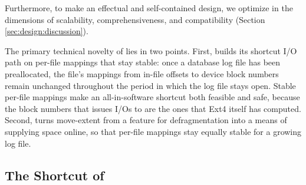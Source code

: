 Furthermore,
to make 
%
   an effectual and self-contained design, we optimize \odes in the dimensions of
 scalability, comprehensiveness, and compatibility (Section \ref{sec:design:discussion}). 

The primary technical novelty of \odes lies in two points. First, \odes builds its
shortcut I/O path on per-file mappings that stay stable: once a database log file
has been preallocated, the file's mappings from in-file offsets to device block
numbers remain unchanged throughout the period in which the log file stays open.
Stable per-file mappings make an all-in-software shortcut both feasible and safe,
because the block numbers that \odes issues I/Os to are the ones that Ext4 itself
has computed. Second, \odes turns move-extent from a feature for defragmentation
into a means of supplying space online, so that per-file mappings stay equally
stable for a growing log file.

\subsection{The Shortcut of \odes}\label{sec:design:components}


